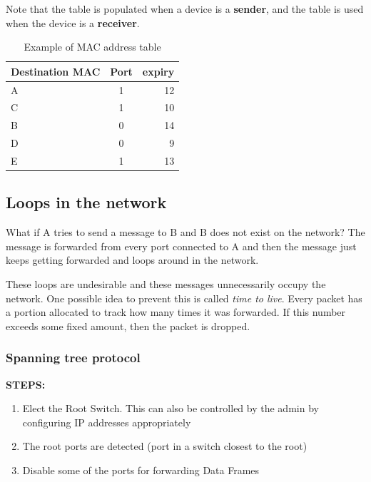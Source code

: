 \documentclass[12pt]{article}
\newcommand{\tbox}[1]{\noindent\fbox{\parbox{\textwidth}{#1}}}
\begin{document}
Note that the table is populated when a device is a \textbf{sender}, and the table is used when the device is a 
\textbf{receiver}. 

\begin{table}[h!]
    \centering
    \begin{tabular}{l c r}
    \toprule
    Destination MAC & Port & expiry \\
    \midrule
    A & 1 & 12   \\
    C & 1 & 10 \\
    B & 0 & 14 \\
    D & 0 & 9 \\
    E & 1 & 13 \\
    \bottomrule
    \end{tabular}
    \caption{Example of MAC address table}
\end{table}
    

\subsection{Loops in the network}

What if A tries to send a message to B and B does not exist on the network? 
The message is forwarded from every port connected to A and then the message just keeps getting forwarded and loops around in the 
network. 

These loops are undesirable and these messages unnecessarily occupy the network. One possible 
idea to prevent this is called \textit{time to live}. Every packet has a portion allocated to track how many times it was 
forwarded. If this number exceeds some fixed amount, then the packet is dropped. 

\subsubsection{Spanning tree protocol}
\textbf{STEPS:}
\begin{enumerate}
    \item Elect the Root Switch. This can also be controlled by the admin by configuring IP addresses appropriately
    \item The root ports are detected (port in a switch closest to the root)
    \item Disable some of the ports for forwarding Data Frames
\end{enumerate}

\noindent\tbox{
    \begin{center}
    \textbf{\Huge Lecture 19}
    \end{center}
}
\end{document}
